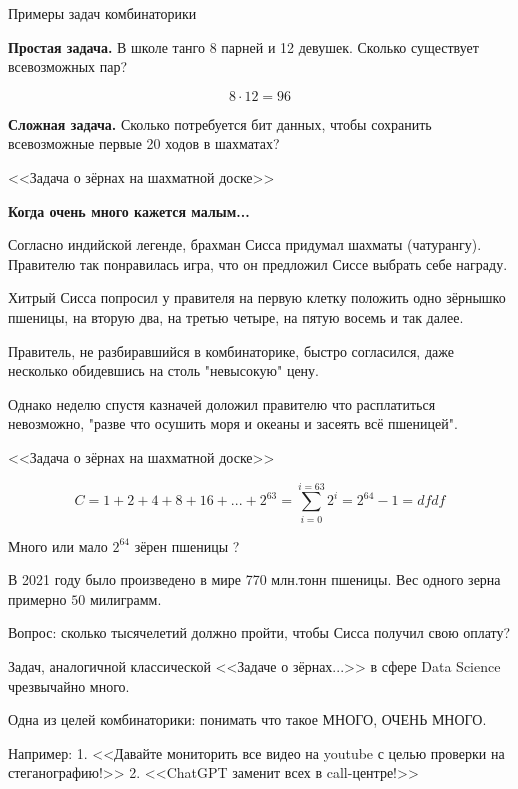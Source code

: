 \begin{frame}{Примеры задач комбинаторики}

\textbf{Простая задача.}
В школе танго 8 парней 
и 12 девушек.
Сколько существует всевозможных пар?

\begin{equation*}
8 \cdot 12 = 96
\end{equation*}

\textbf{Сложная задача.}
Сколько потребуется бит данных, 
чтобы сохранить всевозможные первые 20 ходов в шахматах?
\end{frame}


\begin{frame}{<<Задача о зёрнах на шахматной доске>>}
	
	\textbf{Когда очень много кажется малым...}
	
	Согласно индийской легенде, 
	брахман Сисса придумал шахматы (чатурангу).
	Правителю так понравилась игра, что он предложил Сиссе 
	выбрать себе награду.
	
	Хитрый Сисса попросил у правителя 
	на первую клетку положить одно зёрнышко пшеницы,
	на вторую два, 
	на третью четыре,
	на пятую восемь и так далее.
	
	Правитель, не разбиравшийся в комбинаторике,
	быстро согласился, даже несколько 
	обидевшись на столь "невысокую" цену.
	
	Однако неделю спустя 
	казначей доложил правителю что расплатиться невозможно,
	"разве что осушить моря и океаны и засеять всё пшеницей".
	
\end{frame}

\begin{frame}{<<Задача о зёрнах на шахматной доске>>}

\begin{equation*}
C = 1 + 2 + 4 + 8 + 16 + ... + 2^63 = \sum_{i=0}^{i=63} 2^i = 2^{64} - 1
=dfdf
\end{equation*}

Много или мало $2^{64}$ зёрен пшеницы ?

В 2021 году было произведено в мире 770 млн.тонн пшеницы.
Вес одного зерна примерно $50$ милиграмм.

Вопрос: сколько тысячелетий должно пройти, чтобы Сисса получил 
свою оплату?

\end{frame}

\begin{frame}
Задач, аналогичной классической 
<<Задаче о зёрнах...>>
в сфере Data Science чрезвычайно много.

Одна из целей комбинаторики:
понимать что такое МНОГО, ОЧЕНЬ МНОГО.

Например:
1. <<Давайте мониторить все видео на youtube с целью проверки на стеганографию!>>
2. <<ChatGPT заменит всех в call-центре!>>
 	
\end{frame}


